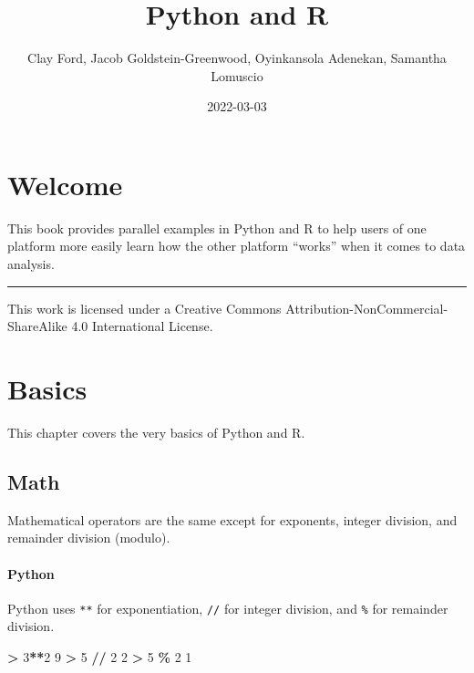 \documentclass[
]{book}
\title{Python and R}
\author{Clay Ford, Jacob Goldstein-Greenwood, Oyinkansola Adenekan, Samantha Lomuscio}
\date{2022-03-03}
\newenvironment{Shaded}{\begin{snugshade}}{\end{snugshade}}
\newcommand{\DecValTok}[1]{\textcolor[rgb]{0.00,0.00,0.81}{#1}}
\newcommand{\OperatorTok}[1]{\textcolor[rgb]{0.81,0.36,0.00}{\textbf{#1}}}
\begin{document}
\maketitle

{
\setcounter{tocdepth}{1}
\tableofcontents
}
\hypertarget{welcome}{%
\chapter*{Welcome}\label{welcome}}

This book provides parallel examples in Python and R to help users of one platform more easily learn how the other platform ``works'' when it comes to data analysis.

\begin{center}\rule{0.5\linewidth}{0.5pt}\end{center}

This work is licensed under a Creative Commons Attribution-NonCommercial-ShareAlike 4.0 International License.

\hypertarget{basics}{%
\chapter{Basics}\label{basics}}

This chapter covers the very basics of Python and R.

\hypertarget{math}{%
\section{Math}\label{math}}

Mathematical operators are the same except for exponents, integer division, and remainder division (modulo).

\hypertarget{python}{%
\subsubsection*{Python}\label{python}}

Python uses \texttt{**} for exponentiation, \texttt{//} for integer division, and \texttt{\%} for remainder division.

\begin{Shaded}
\begin{Highlighting}[]
\OperatorTok{\textgreater{}} \DecValTok{3}\OperatorTok{**}\DecValTok{2}
\DecValTok{9}
\OperatorTok{\textgreater{}} \DecValTok{5} \OperatorTok{//} \DecValTok{2}
\DecValTok{2}
\OperatorTok{\textgreater{}} \DecValTok{5} \OperatorTok{\%} \DecValTok{2}
\DecValTok{1}
\end{Highlighting}
\end{Shaded}
\end{document}
